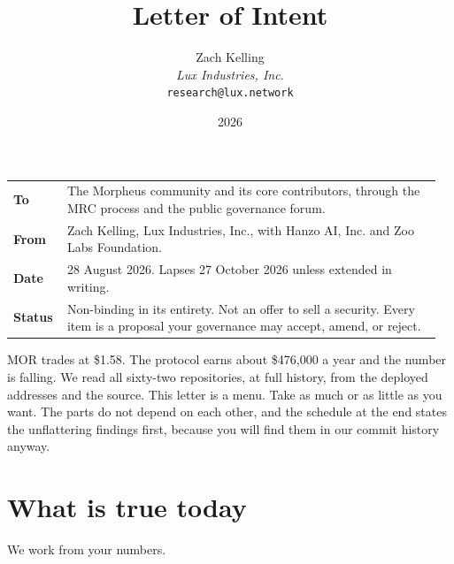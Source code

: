 \documentclass[11pt,a4paper]{article}
\title{Letter of Intent}
\author{Zach Kelling\\\textit{Lux Industries, Inc.}\\\texttt{research@lux.network}}
\date{2026}
\begin{document}
\luxcoverpage

\noindent
\begin{tabular}{@{}p{0.12\linewidth}p{0.84\linewidth}@{}}
\textbf{To} & The Morpheus community and its core contributors, through the MRC
process and the public governance forum.\\[0.4ex]
\textbf{From} & Zach Kelling, Lux Industries, Inc., with Hanzo AI, Inc. and Zoo
Labs Foundation.\\[0.4ex]
\textbf{Date} & 28 August 2026. Lapses 27 October 2026 unless extended in writing.\\[0.4ex]
\textbf{Status} & Non-binding in its entirety. Not an offer to sell a security.
Every item is a proposal your governance may accept, amend, or reject.
\end{tabular}

\vspace{1.0ex}

\noindent MOR trades at \$1.58. The protocol earns about \$476{,}000 a year and
the number is falling. We read all sixty-two repositories, at full history, from
the deployed addresses and the source. This letter is a menu. Take as much or as
little as you want. The parts do not depend on each other, and the schedule at
the end states the unflattering findings first, because you will find them in our
commit history anyway.

\section*{What is true today}

We work from your numbers.
\end{document}

